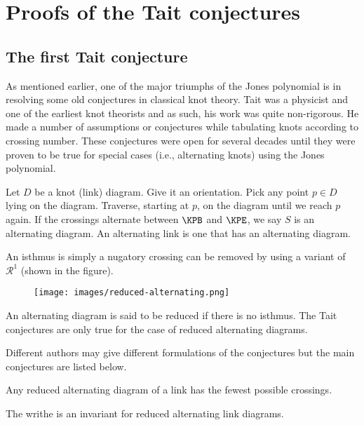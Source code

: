 \chapter{Proofs of the Tait conjectures}
\label{chapter4}

\section{The first Tait conjecture}

As mentioned earlier, one of the major triumphs of the Jones polynomial is in resolving some old conjectures in classical knot theory. Tait was a physicist and one of the earliest knot theorists and as such, his work was quite non-rigorous. He made a number of assumptions or conjectures while tabulating knots according to crossing number. These conjectures were open for several decades until they were proven to be true for special cases (i.e., alternating knots) using the Jones polynomial.

Let $D$ be a knot (link) diagram. Give it an orientation. Pick any point $p \in D$ lying on the diagram. Traverse, starting at $p$, on the diagram until we reach $p$ again. If the crossings alternate between $\KPB$ and $\KPE$, we say $S$ is an alternating diagram. An alternating link is one that has an alternating diagram.

An isthmus is simply a nugatory crossing can be removed by using a variant of $\mathcal{R}^1$ (shown in the figure).
\begin{figure}[h]
  \centering
  \texttt{[image: images/reduced-alternating.png]}
\end{figure}

An alternating diagram is said to be reduced if there is no isthmus. The Tait conjectures are only true for the case of reduced alternating diagrams.

Different authors may give different formulations of the conjectures but the main conjectures are listed below.

\begin{conjecture}
\label{cha:resolv-tait-conj}
Any reduced alternating diagram of a link has the fewest possible crossings.
\end{conjecture}

\begin{conjecture}
\label{cha:resolv-tait-conj}
The writhe is an invariant for reduced alternating link diagrams.
\end{conjecture}

